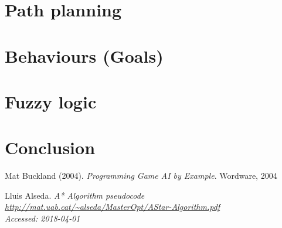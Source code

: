 \documentclass[11pt]{article}
\begin{document}
    \section{Path planning}\label{sec:pathPlanning}
    

    \newpage
    \section{Behaviours (Goals)}\label{sec:behaviour}
    
    
    \newpage
    \section{Fuzzy logic}\label{sec:fuzzyLogic}
    
    
    \newpage
    \section{Conclusion}\label{sec:conclusion}
    
    
    \newpage

    \begin{thebibliography}{9}
        Mat Buckland (2004).
        \textit{Programming Game AI by Example}.
        Wordware, 2004

        Lluis Alseda.
        \textit{A* Algorithm pseudocode}
        \\\textit{\url{http://mat.uab.cat/~alseda/MasterOpt/AStar-Algorithm.pdf}}
        \\\textit{Accessed: 2018-04-01}
    \end{thebibliography}
\end{document}
